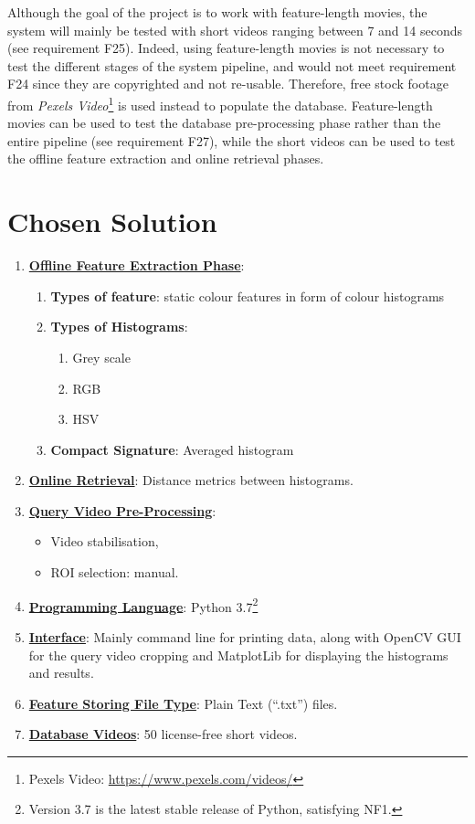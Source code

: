 Although the goal of the project is to work with feature-length movies, the system will mainly be tested with short videos ranging between 7 and 14 seconds (see requirement F25). Indeed, using feature-length movies is not necessary to test the different stages of the system pipeline, and would not meet requirement F24 since they are copyrighted and not re-usable. Therefore, free stock footage from \textit{Pexels Video}\footnote{Pexels Video: \url{https://www.pexels.com/videos/}} is used instead to populate the database. Feature-length movies can be used to test the database pre-processing phase rather than the entire pipeline (see requirement F27), while the short videos can be used to test the offline feature extraction and online retrieval phases.

\section{Chosen Solution}

\begin{enumerate}
    \item \underline{\textbf{Offline Feature Extraction Phase}}:
    \begin{enumerate}
        \item \textbf{Types of feature}: static colour features in form of colour histograms
        \item \textbf{Types of Histograms}:
        \begin{enumerate}
            \item Grey scale
            \item RGB
            \item HSV
        \end{enumerate}
        \item \textbf{Compact Signature}: Averaged histogram
    \end{enumerate}
    \item \underline{\textbf{Online Retrieval}}: Distance metrics between histograms.
    \item \underline{\textbf{Query Video Pre-Processing}}: 
    \begin{itemize}
        \item Video stabilisation,
        \item ROI selection: manual.
    \end{itemize}
    \item \underline{\textbf{Programming Language}}: Python 3.7\footnote{Version 3.7 is the latest stable release of Python, satisfying NF1.}
    \item \underline{\textbf{Interface}}: Mainly command line for printing data, along with OpenCV GUI for the query video cropping and MatplotLib for displaying the histograms and results.
    \item \underline{\textbf{Feature Storing File Type}}: Plain Text (``.txt'') files.
    \item \underline{\textbf{Database Videos}}: 50 license-free short videos.
\end{enumerate}


